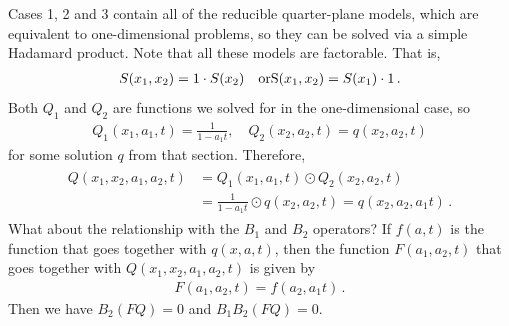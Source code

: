 Cases 1, 2 and 3 contain all of the reducible quarter-plane models, which are equivalent to one-dimensional problems, so they can be solved via a simple Hadamard product. Note that all these models are factorable. That is,
\begin{align}
	S(x_1,x_2) = 1\cdot S(x_2)\quad\text{or}\text  S(x_1,x_2) = S(x_1)\cdot 1\,.
\end{align}
Both $Q_1$ and $Q_2$ are functions we solved for in the one-dimensional case, so
\begin{align}
	Q_1(x_1,a_1,t) = \frac{1}{1-a_1 t},\quad Q_2(x_2,a_2,t) = q(x_2,a_2,t)
\end{align}
for some solution $q$ from that section. Therefore,
\begin{align}\begin{split}
	Q(x_1,x_2,a_1,a_2,t) &= Q_1(x_1,a_1,t) \odot Q_2(x_2,a_2,t) \\
	&= \frac{1}{1-a_1 t}\odot q(x_2,a_2,t) = q(x_2,a_2,a_1 t)\,.
\end{split}\end{align}
What about the relationship with the $B_1$ and $B_2$ operators? If $f(a,t)$ is the function that goes together with $q(x,a,t)$, then the function $F(a_1,a_2,t)$ that goes together with $Q(x_1,x_2,a_1,a_2,t)$ is given by
\begin{align}
	F(a_1,a_2,t) = f(a_2,a_1 t)\,.
\end{align}
Then we have $B_2 (FQ) = 0$ and $B_1B_2(FQ) = 0$.

